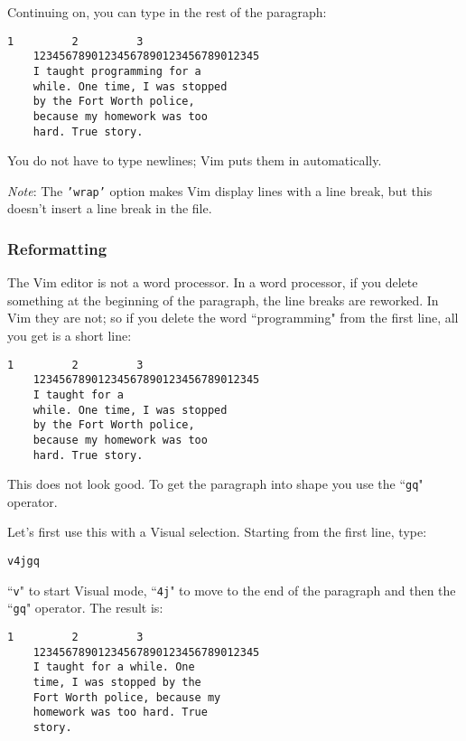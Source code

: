 Continuing on, you can type in the rest of the paragraph:

\begin{Verbatim}[samepage=true]
             1         2         3
    12345678901234567890123456789012345
    I taught programming for a 
    while. One time, I was stopped 
    by the Fort Worth police, 
    because my homework was too 
    hard. True story. 
\end{Verbatim}

You do not have to type newlines; Vim puts them in automatically.

\emph{Note}: The \texttt{'wrap'} option makes Vim display lines with a line break, but this doesn't insert a line break in the file.
\subsubsection{Reformatting}
The Vim editor is not a word processor.
In a word processor, if you delete something at the beginning of the paragraph, the line breaks are reworked.
In Vim they are not; so if you delete the word ``programming" from the first line, all you get is a short line:

\begin{Verbatim}[samepage=true]
             1         2         3
    12345678901234567890123456789012345
    I taught for a 
    while. One time, I was stopped 
    by the Fort Worth police, 
    because my homework was too 
    hard. True story. 
\end{Verbatim}

This does not look good.
To get the paragraph into shape you use the ``\texttt{gq}" operator.

Let's first use this with a Visual selection.
Starting from the first line, type:

\begin{Verbatim}[samepage=true]
 v4jgq
\end{Verbatim}

``\texttt{v}" to start Visual mode, ``\texttt{4j}" to move to the end of the paragraph and then the ``\texttt{gq}" operator.
The result is:

\begin{Verbatim}[samepage=true]
             1         2         3
    12345678901234567890123456789012345
    I taught for a while. One 
    time, I was stopped by the 
    Fort Worth police, because my 
    homework was too hard. True 
    story. 
\end{Verbatim}


